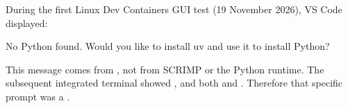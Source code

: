 \documentclass[letterpaper,10pt,english]{sphinxmanual}
\begin{document}
\sphinxAtStartPar
During the first Linux Dev Containers GUI test (19 November 2026),
VS Code displayed:

\begin{sphinxVerbatim}[commandchars=\\\{\}]
No Python found. Would you like to install uv and use it to
install Python?
\end{sphinxVerbatim}

\sphinxAtStartPar
This message comes from , not from SCRIMP or the Python runtime. The
subsequent integrated terminal showed , and both
 and
 .
Therefore that specific prompt was a .
\end{document}
